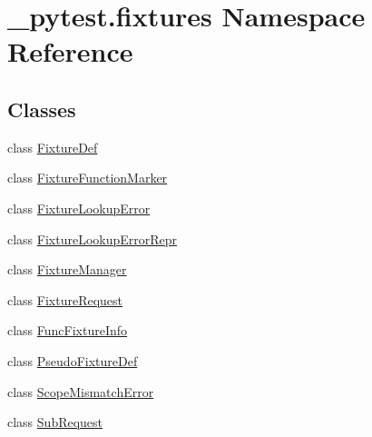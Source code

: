 \hypertarget{namespace__pytest_1_1fixtures}{}\section{\+\_\+pytest.\+fixtures Namespace Reference}
\label{namespace__pytest_1_1fixtures}
\subsection*{Classes}
\begin{DoxyCompactItemize}
\item 
class \hyperlink{class__pytest_1_1fixtures_1_1_fixture_def}{Fixture\+Def}
\item 
class \hyperlink{class__pytest_1_1fixtures_1_1_fixture_function_marker}{Fixture\+Function\+Marker}
\item 
class \hyperlink{class__pytest_1_1fixtures_1_1_fixture_lookup_error}{Fixture\+Lookup\+Error}
\item 
class \hyperlink{class__pytest_1_1fixtures_1_1_fixture_lookup_error_repr}{Fixture\+Lookup\+Error\+Repr}
\item 
class \hyperlink{class__pytest_1_1fixtures_1_1_fixture_manager}{Fixture\+Manager}
\item 
class \hyperlink{class__pytest_1_1fixtures_1_1_fixture_request}{Fixture\+Request}
\item 
class \hyperlink{class__pytest_1_1fixtures_1_1_func_fixture_info}{Func\+Fixture\+Info}
\item 
class \hyperlink{class__pytest_1_1fixtures_1_1_pseudo_fixture_def}{Pseudo\+Fixture\+Def}
\item 
class \hyperlink{class__pytest_1_1fixtures_1_1_scope_mismatch_error}{Scope\+Mismatch\+Error}
\item 
class \hyperlink{class__pytest_1_1fixtures_1_1_sub_request}{Sub\+Request}
\end{DoxyCompactItemize}
